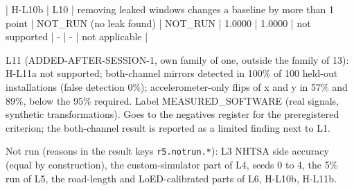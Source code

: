 | H-L10b | L10 | removing leaked windows changes a baseline by more than 1 point | NOT\_RUN (no leak found) | NOT\_RUN | 1.0000 | 1.0000 | not supported | - | - | not applicable |

L11 (ADDED-AFTER-SESSION-1, own family of one, outside the family of 13): H-L11a not supported; both-channel mirrors detected in 100\% of 100 held-out installations (false detection 0\%); accelerometer-only flips of x and y in 57\% and 89\%, below the 95\% required. Label MEASURED\_SOFTWARE (real signals, synthetic transformations). Goes to the negatives register for the preregistered criterion; the both-channel result is reported as a limited finding next to L1.

Not run (reasons in the result keys \texttt{r5.notrun.*}): L3 NHTSA side accuracy (equal by construction), the custom-simulator part of L4, seeds 0 to 4, the 5\% run of L5, the road-length and LoED-calibrated parts of L6, H-L10b, H-L11b.

